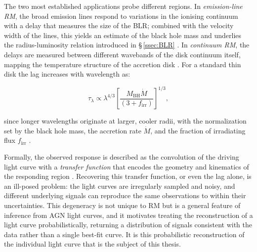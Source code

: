 The two most established applications probe different regions. In \textit{emission-line RM}, the broad emission lines respond to variations in the ionising continuum with a delay that measures the size of the BLR; combined with the velocity width of the lines, this yields an estimate of the black hole mass and underlies the radius-luminosity relation introduced in \S\,\ref{ssec:BLR} \parencite{Peterson1993RM}. In \textit{continuum RM}, the delays are measured between different wavebands of the disk continuum itself, mapping the temperature structure of the accretion disk \parencite{Collier1999OGContReb}. For a standard thin disk the lag increases with wavelength as:



\begin{equation}
    \label{eq:disklag}
    \tau_\lambda \propto \lambda^{4/3} \left[\frac{M_\mathrm{BH}\dot{M}}{(3 + f_\mathrm{irr})}\right]^{1/3},
\end{equation}

since longer wavelengths originate at larger, cooler radii, with the normalization set by the black hole mass, the accretion rate $\dot{M}$, and the fraction of irradiating flux $f_\mathrm{irr}$ \parencite{Cackett2021RMFiguresGOOD}.

Formally, the observed response is described as the convolution of the driving light curve with a \textit{transfer function} that encodes the geometry and kinematics of the responding region \parencite{Blandford1982RM}. Recovering this transfer function, or even the lag alone, is an ill-posed problem: the light curves are irregularly sampled and noisy, and different underlying signals can reproduce the same observations to within their uncertainties. This degeneracy is not unique to RM but is a general feature of inference from AGN light curves, and it motivates treating the reconstruction of a light curve probabilistically, returning a distribution of signals consistent with the data rather than a single best-fit curve. It is this probabilistic reconstruction of the individual light curve that is the subject of this thesis.



